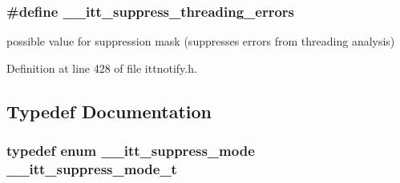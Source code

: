 \hypertarget{group__suppress_gaef282c38d1dd1bdd62faa58a59936f34}{
\subsubsection[{\-\_\-\-\_\-itt\-\_\-suppress\-\_\-threading\-\_\-errors}]{\setlength{\rightskip}{0pt plus 5cm}\#define \-\_\-\-\_\-itt\-\_\-suppress\-\_\-threading\-\_\-errors}}\label{group__suppress_gaef282c38d1dd1bdd62faa58a59936f34}


possible value for suppression mask (suppresses errors from threading analysis) 



Definition at line 428 of file ittnotify.\-h.



\subsection{Typedef Documentation}
\hypertarget{group__suppress_ga63fa4a192bd1e53599c2e58fe4527b5a}{
\subsubsection[{\-\_\-\-\_\-itt\-\_\-suppress\-\_\-mode\-\_\-t}]{\setlength{\rightskip}{0pt plus 5cm}typedef enum {\bf \-\_\-\-\_\-itt\-\_\-suppress\-\_\-mode}  {\bf \-\_\-\-\_\-itt\-\_\-suppress\-\_\-mode\-\_\-t}}}\label{group__suppress_ga63fa4a192bd1e53599c2e58fe4527b5a}


